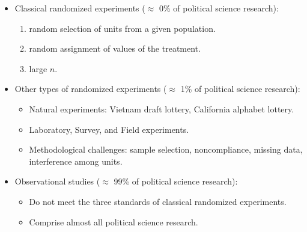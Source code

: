 \documentclass[20pt,landscape,pdftex]{foils}
\begin{document}

\hypersetup{pdfpagetransition=Replace}

\begin{itemize}
\item Classical randomized experiments ($\approx$ 0\% of political
  science research):\pause
  \begin{enumerate}
  \item random selection of units from a given population.\pause
  \item random assignment of values of the treatment.\pause
  \item large $n$.\pause
  \end{enumerate}

\item Other types of randomized experiments ($\approx$ 1\% of
  political science research):\pause

  \begin{itemize}
  \item Natural experiments:  Vietnam draft lottery, California alphabet lottery.\pause
  \item Laboratory, Survey, and Field experiments.\pause
  \item Methodological challenges: sample selection, noncompliance,
    missing data, interference among units.\pause
  \end{itemize}
  
\item Observational studies ($\approx$ 99\% of political science
  research):\pause
  \begin{itemize}
  \item Do not meet the three standards of classical randomized
    experiments.\pause
  \item Comprise almost all political science research.\pause
  \end{itemize}

\end{itemize}





\hypersetup{pdfpagetransition=Replace}
\end{document}
